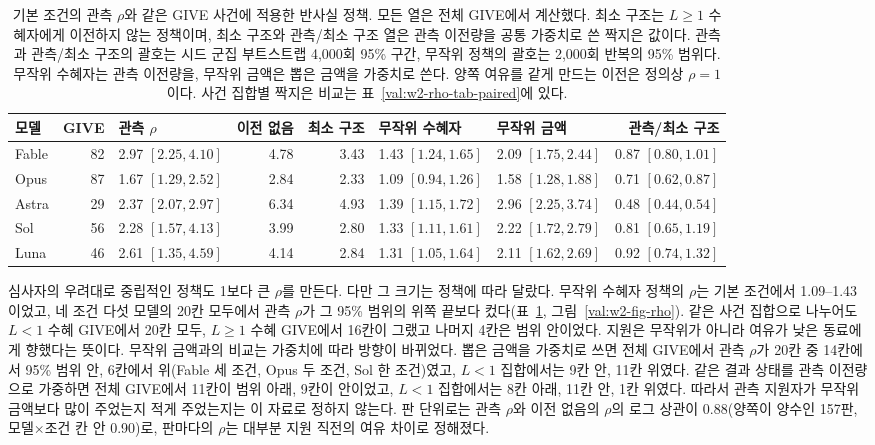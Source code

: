 \begin{table}[!htbp]
\centering
\small
\caption{기본 조건의 관측 $\rho$와 같은 GIVE 사건에 적용한 반사실 정책. 모든 열은 전체 GIVE에서 계산했다. 최소 구조는 $L\geq1$ 수혜자에게 이전하지 않는 정책이며, 최소 구조와 관측/최소 구조 열은 관측 이전량을 공통 가중치로 쓴 짝지은 값이다. 관측과 관측/최소 구조의 괄호는 시드 군집 부트스트랩 4,000회 95\% 구간, 무작위 정책의 괄호는 2,000회 반복의 95\% 범위다. 무작위 수혜자는 관측 이전량을, 무작위 금액은 뽑은 금액을 가중치로 쓴다. 양쪽 여유를 같게 만드는 이전은 정의상 $\rho=1$이다. 사건 집합별 짝지은 비교는 표~\ref{val:w2-rho-tab-paired}에 있다.}
\label{val:w2-tab-rho}
\setlength{\tabcolsep}{4pt}
\begin{tabular}{lrlrrllr}
\toprule
모델 & GIVE & 관측 $\rho$ & 이전 없음 & 최소 구조 & 무작위 수혜자 & 무작위 금액 & 관측/최소 구조 \\
\midrule
Fable & 82 & 2.97 $[2.25, 4.10]$ & 4.78 & 3.43 & 1.43 $[1.24, 1.65]$ & 2.09 $[1.75, 2.44]$ & 0.87 $[0.80, 1.01]$ \\
Opus & 87 & 1.67 $[1.29, 2.52]$ & 2.84 & 2.33 & 1.09 $[0.94, 1.26]$ & 1.58 $[1.28, 1.88]$ & 0.71 $[0.62, 0.87]$ \\
Astra & 29 & 2.37 $[2.07, 2.97]$ & 6.34 & 4.93 & 1.39 $[1.15, 1.72]$ & 2.96 $[2.25, 3.74]$ & 0.48 $[0.44, 0.54]$ \\
Sol & 56 & 2.28 $[1.57, 4.13]$ & 3.99 & 2.80 & 1.33 $[1.11, 1.61]$ & 2.22 $[1.72, 2.79]$ & 0.81 $[0.65, 1.19]$ \\
Luna & 46 & 2.61 $[1.35, 4.59]$ & 4.14 & 2.84 & 1.31 $[1.05, 1.64]$ & 2.11 $[1.62, 2.69]$ & 0.92 $[0.74, 1.32]$ \\
\bottomrule
\end{tabular}
\end{table}

심사자의 우려대로 중립적인 정책도 1보다 큰 $\rho$를 만든다. 다만 그 크기는 정책에 따라 달랐다. 무작위 수혜자 정책의 $\rho$는 기본 조건에서 1.09--1.43이었고, 네 조건 다섯 모델의 20칸 모두에서 관측 $\rho$가 그 95\% 범위의 위쪽 끝보다 컸다(표~\ref{val:w2-tab-rho}, 그림~\ref{val:w2-fig-rho}). 같은 사건 집합으로 나누어도 $L<1$ 수혜 GIVE에서 20칸 모두, $L\geq1$ 수혜 GIVE에서 16칸이 그랬고 나머지 4칸은 범위 안이었다. 지원은 무작위가 아니라 여유가 낮은 동료에게 향했다는 뜻이다. 무작위 금액과의 비교는 가중치에 따라 방향이 바뀌었다. 뽑은 금액을 가중치로 쓰면 전체 GIVE에서 관측 $\rho$가 20칸 중 14칸에서 95\% 범위 안, 6칸에서 위(Fable 세 조건, Opus 두 조건, Sol 한 조건)였고, $L<1$ 집합에서는 9칸 안, 11칸 위였다. 같은 결과 상태를 관측 이전량으로 가중하면 전체 GIVE에서 11칸이 범위 아래, 9칸이 안이었고, $L<1$ 집합에서는 8칸 아래, 11칸 안, 1칸 위였다. 따라서 관측 지원자가 무작위 금액보다 많이 주었는지 적게 주었는지는 이 자료로 정하지 않는다. 판 단위로는 관측 $\rho$와 이전 없음의 $\rho$의 로그 상관이 0.88(양쪽이 양수인 157판, 모델$\times$조건 칸 안 0.90)로, 판마다의 $\rho$는 대부분 지원 직전의 여유 차이로 정해졌다.

